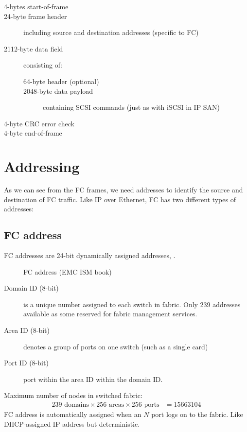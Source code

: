 \begin{description}
\item[4-bytes start-of-frame]
\item[24-byte frame header]
including source and destination addresses (specific to FC)
\item[2112-byte data field]
consisting of:

\begin{description}
\item[64-byte header (optional)]
\item[2048-byte data payload]
containing SCSI commands (just as with iSCSI in IP SAN)
\end{description}
\item[4-byte CRC error check]
\item[4-byte end-of-frame]
\end{description}

\section{Addressing}\label{addressing}

As we can see from the FC frames, we need addresses to identify the
source and destination of FC traffic. Like IP over Ethernet, FC has two
different types of addresses:

\subsection{FC address}\label{fc-address}

FC addresses are 24-bit dynamically assigned addresses, .

\begin{figure}
\centering
\caption{FC address (EMC ISM book){}}
\end{figure}

\begin{description}
\item[Domain ID (8-bit)]
is a unique number assigned to each switch in fabric. Only 239 addresses
available as some reserved for fabric management services.
\item[Area ID (8-bit)]
denotes a group of ports on one switch (such as a single card)
\item[Port ID (8-bit)]
port within the area ID within the domain ID.
\end{description}

Maximum number of nodes in switched fabric: \[\begin{aligned}
  \mbox{239 domains} \times \mbox{256 areas} \times \mbox{256 ports} & = 15663104\end{aligned}\]
FC address is automatically assigned when an \(N\) port logs on to the
fabric. Like DHCP-assigned IP address but deterministic.

